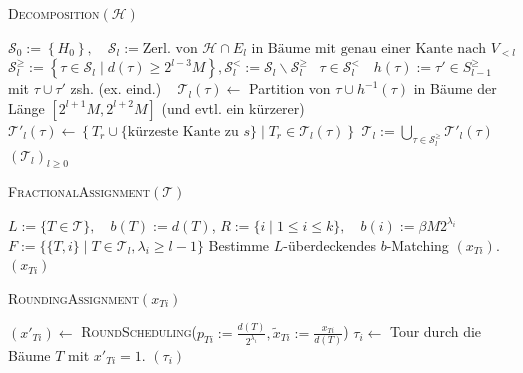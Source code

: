 \documentclass[a4paper,ngerman,12pt,bibtotoc]{scrartcl}
\newcommand{\LineFor}[2]{\State\algorithmicfor\ {#1}\ \algorithmicdo\ {#2} \algorithmicend\ \algorithmicfor}
\theoremstyle{definition}
\theoremstyle{plain}
\theoremstyle{remark}
\newcommand{\Hc}{\mathcal{H}}
\newcommand{\Tc}{\mathcal{T}}
\newcommand{\Sc}{\mathcal{S}}
\begin{document}
\begin{minipage}{0.5\textwidth}
		\begin{algorithm}[H]\footnotesize
			\caption{\small \textsc{Decomposition}$\left(\Hc\right)$}\label{AlgDecomposition}
			\begin{algorithmic}[1]
				\State $\Sc_0 := \left\lbrace H_0 \right\rbrace,\quad \Sc_l := \text{Zerl. von } \Hc\cap E_l \text{ in Bäume mit genau einer Kante nach } V_{<l}$
				\State $\Sc_l^{\geq} := \left\{\tau \in \Sc_l \mid d(\tau) \geq 2^{l-3}M\right\}, \Sc_l^< := \Sc_l \backslash \Sc_l^{\geq}$
				\LineFor{$\tau \in \Sc_l^{<}$}{$h(\tau) := \tau' \in S_{l-1}^{\geq}$ mit $\tau \cup \tau'$ zsh. (ex. eind.)}
				\For{$\tau \in \Sc_l^{\geq}$}
				\State $\Tc_l(\tau) \gets$ Partition von $\tau \cup h^{-1}(\tau)$ in Bäume der Länge $\left[2^{l+1}M, 2^{l+2}M\right]$ 
				\Statex \hspace{6.5em} (und evtl. ein kürzerer)
				\State $\Tc'_l(\tau) \gets \left\{T_r \cup \{\text{kürzeste Kante zu } s\} \mid T_r \in \Tc_l(\tau)\right\}$
				\EndFor
				\State $\Tc_l := \bigcup_{\tau \in \Sc_l^{\geq}}\Tc'_l(\tau)$
				\State \Return $\left(\Tc_l\right)_{l\geq 0}$
			\end{algorithmic}
		\end{algorithm}
		
		\begin{algorithm}[H]\footnotesize
			\caption{\small \textsc{FractionalAssignment}$\left(\Tc\right)$}\label{AlgFractionalAssignment}
			\begin{algorithmic}[1]
				\State $L := \{T \in \Tc\},\quad b(T) := d(T)$, \quad $R := \{i \mid 1\leq i \leq k\},\quad b(i) := \beta M 2^{\lambda_i}$
				\State $F := \{\{T,i\} \mid T \in \Tc_l, \lambda_i \geq l-1\}$ 
				\State Bestimme $L$-überdeckendes $b$-Matching $\left(x_{Ti}\right)$.
				\State \Return $\left(x_{Ti}\right)$
			\end{algorithmic}
		\end{algorithm}
		
		\begin{algorithm}[H]\footnotesize
			\caption{\small \textsc{RoundingAssignment}$\left(x_{Ti}\right)$}\label{AlgRoundingAssignment}
			\begin{algorithmic}[1]
				\State $\left(x'_{Ti}\right) \gets$ \textsc{RoundScheduling}($p_{Ti} := \frac{d(T)}{2^{\lambda_i}}, \tilde{x}_{Ti} := \frac{x_{Ti}}{d(T)}$)
				\State $\tau_i \gets$ Tour durch die Bäume $T$ mit $x'_{Ti} = 1$.
				\State \Return $\left(\tau_i\right)$
			\end{algorithmic}
		\end{algorithm}								
	\end{minipage}
\end{document}
